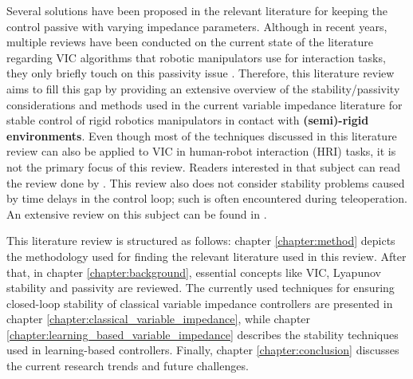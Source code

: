 Several solutions have been proposed in the relevant literature for keeping the control passive with varying impedance parameters. Although in recent years, multiple reviews have been conducted on the current state of the literature regarding VIC algorithms that robotic manipulators use for interaction tasks, they only briefly touch on this passivity issue \cite{suomalainenSurveyRobotManipulation2021,songTutorialSurveyComparison2019,abu-dakkaVariableImpedanceControl2020,al-shukaActiveImpedanceControl2018}. Therefore, this literature review aims to fill this gap by providing an extensive overview of the stability/passivity considerations and methods used in the current variable impedance literature for stable control of rigid robotics manipulators in contact with \textbf{(semi)-rigid environments}. Even though most of the techniques discussed in this literature review can also be applied to VIC in human-robot interaction (HRI) tasks, it is not the primary focus of this review. Readers interested in that subject can read the review done by \cite{sharifiImpedanceVariationLearning2021}. This review also does not consider stability problems caused by time delays in the control loop; such is often encountered during teleoperation. An extensive review on this subject can be found in \cite{farajiparvarBriefSurveyTelerobotic2020}.

This literature review is structured as follows: chapter \ref{chapter:method} depicts the methodology used for finding the relevant literature used in this review. After that, in chapter \ref{chapter:background}, essential concepts like VIC, Lyapunov stability and passivity are reviewed. The currently used techniques for ensuring closed-loop stability of classical variable impedance controllers are presented in chapter \ref{chapter:classical_variable_impedance}, while chapter \ref{chapter:learning_based_variable_impedance} describes the stability techniques used in learning-based controllers. Finally, chapter \ref{chapter:conclusion} discusses the current research trends and future challenges.

